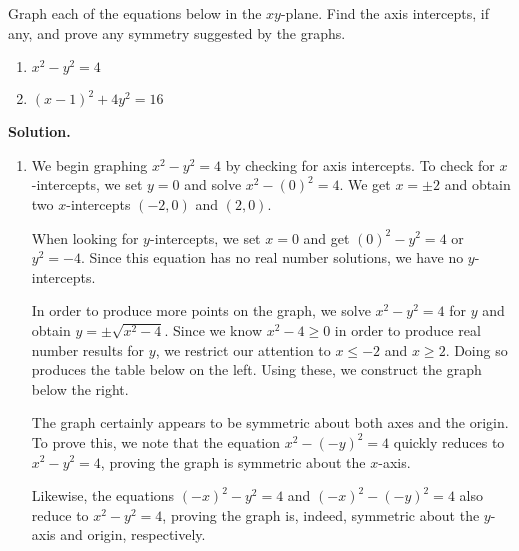 \documentclass{ximera}
\begin{document}
\begin{example}  \label{graphssymmex} Graph each of the equations below in the $xy$-plane.  Find the axis intercepts, if any,  and prove any symmetry suggested by the graphs.  

\begin{multicols}{2}

\begin{enumerate}

\item $x^2-y^2 = 4$

\item $(x-1)^2+4y^2 = 16$

\end{enumerate}

\end{multicols}


{\bf Solution.}

\begin{enumerate}

\item We begin graphing $x^2-y^2 = 4$ by checking for axis intercepts.  To check for $x$-intercepts, we set $y=0$ and solve $x^2 - (0)^2 = 4$.  We get $x = \pm 2$ and obtain two $x$-intercepts $(-2,0)$ and $(2,0)$.  

\smallskip

When looking for $y$-intercepts, we set $x=0$ and get $(0)^2 - y^2 = 4$ or $y^2 = -4$.  Since this equation has no real number solutions, we have no $y$-intercepts.  

\smallskip

In order to produce more points on the graph, we solve $x^2-y^2 = 4$ for $y$ and obtain $y = \pm \sqrt{x^2-4}$.  Since we know $x^2-4 \geq 0$ in order to produce real number results for $y$, we restrict our attention to $x \leq -2$ and $x \geq 2$.  Doing so produces the table below on the left.  Using these, we construct the graph below the right.

\smallskip

The graph certainly appears to be symmetric about both axes and the origin.  To prove this, we note that the equation $x^2-(-y)^2 = 4$ quickly reduces to $x^2-y^2 = 4$, proving the graph is symmetric about the $x$-axis. 

\smallskip

 Likewise, the equations $(-x)^2-y^2 = 4$ and $(-x)^2-(-y)^2 = 4$ also reduce to $x^2-y^2 = 4$, proving the graph is, indeed, symmetric about the $y$-axis and origin, respectively.


\end{enumerate}
\end{example}
\end{document}
